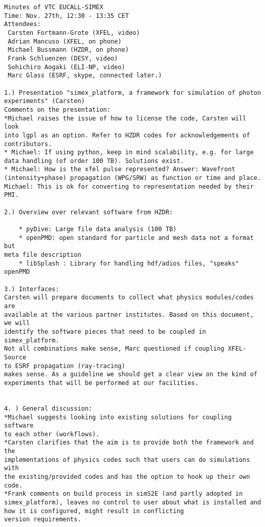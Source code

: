 \documentclass[a4paper]{article}
\begin{document}
\begin{verbatim}
Minutes of VTC EUCALL-SIMEX
Time: Nov. 27th, 12:30 - 13:35 CET
Attendees:
 Carsten Fortmann-Grote (XFEL, video)
 Adrian Mancuso (XFEL, on phone)
 Michael Bussmann (HZDR, on phone)
 Frank Schluenzen (DESY, video)
 Sohichiro Aogaki (ELI-NP, video)
 Marc Glass (ESRF, skype, connected later.)

1.) Presentation "simex_platform, a framework for simulation of photon
experiments" (Carsten)
Comments on the presentation:
*Michael raises the issue of how to license the code, Carsten will look
into lgpl as an option. Refer to HZDR codes for acknowledgements of
contributors.
* Michael: If using python, keep in mind scalability, e.g. for large
data handling (of order 100 TB). Solutions exist.
* Michael: How is the xfel pulse represented? Answer: Wavefront
(intensity+phase) propagation (WPG/SRW) as function or time and place.
Michael: This is ok for converting to representation needed by their PMI.

2.) Overview over relevant software from HZDR:

    * pyDive: Large file data analysis (100 TB)
    * openPMD: open standard for particle and mesh data not a format but
meta file description
    * libSplash : Library for handling hdf/adios files, "speaks" openPMD

3.) Interfaces:
Carsten will prepare documents to collect what physics modules/codes are
available at the various partner institutes. Based on this document, we will
identify the software pieces that need to be coupled in simex_platform.
Not all combinations make sense, Marc questioned if coupling XFEL-Source
to ESRF propagation (ray-tracing)
makes sense. As a guideline we should get a clear view on the kind of
experiments that will be performed at our facilities.


4. ) General discussion:
*Michael suggests looking into existing solutions for coupling software
to each other (workflows).
*Carsten clarifies that the aim is to provide both the framework and the
implementations of physics codes such that users can do simulations with
the existing/provided codes and has the option to hook up their own code.
*Frank comments on build process in simS2E (and partly adopted in
simex_platform), leaves no control to user about what is installed and
how it is configured, might result in conflicting
version requirements.
\end{verbatim}
\end{document}
